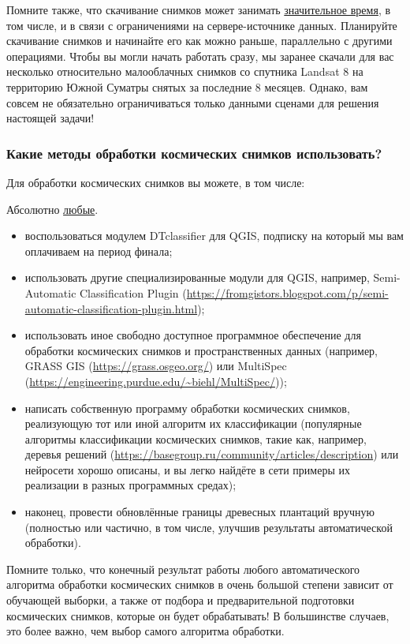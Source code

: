 Помните также, что скачивание снимков может занимать \underline{значительное время}, в том числе, и в связи с ограничениями на сервере-источнике данных. Планируйте скачивание снимков и начинайте его как можно раньше, параллельно с другими операциями. Чтобы вы могли начать работать сразу, мы заранее скачали для вас несколько относительно малооблачных снимков со спутника Landsat 8 на территорию Южной Суматры снятых за последние 8 месяцев. Однако, вам совсем не обязательно ограничиваться только данными сценами для решения настоящей задачи!

\subsubsection*{Какие методы обработки космических снимков использовать?}

Для обработки космических снимков вы можете, в том числе:

Абсолютно \underline{любые}.

\begin{itemize}
    \item воспользоваться модулем DTclassifier для QGIS, подписку на который мы вам оплачиваем на период финала;
    \item использовать другие специализированные модули для QGIS, например, Semi-Automatic Classification Plugin (\url{https://fromgistors.blogspot.com/p/semi-automatic-classification-plugin.html});
    \item использовать иное свободно доступное программное обеспечение для обработки космических снимков и пространственных данных (например, GRASS GIS (\url{https://grass.osgeo.org/}) или MultiSpec (\url{https://engineering.purdue.edu/~biehl/MultiSpec/}));
    \item написать собственную программу обработки космических снимков, реализующую тот или иной алгоритм их классификации (популярные алгоритмы классификации космических снимков, такие как, например, деревья решений (\url{https://basegroup.ru/community/articles/description}) или нейросети хорошо описаны, и вы легко найдёте в сети примеры их реализации в разных программных средах);
    \item наконец, провести обновлённые границы древесных плантаций вручную (полностью или частично, в том числе, улучшив результаты автоматической обработки).
\end{itemize}

Помните только, что конечный результат работы любого автоматического алгоритма обработки космических снимков в очень большой степени зависит от обучающей выборки, а также от подбора и предварительной подготовки космических снимков, которые он будет обрабатывать! В большинстве случаев, это более важно, чем выбор самого алгоритма обработки.

